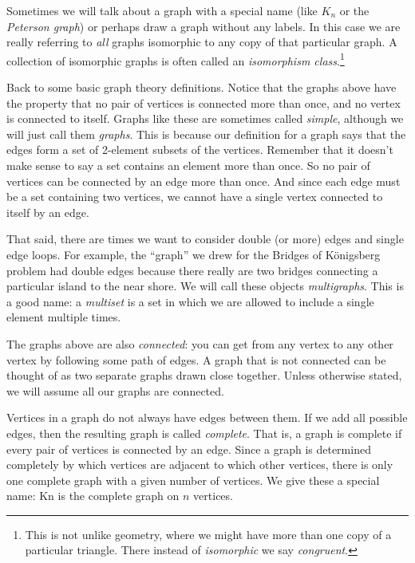\documentclass[12pt]{article}
\begin{document}
Sometimes we will talk about a graph with a special name (like $K_n$ or the \emph{Peterson graph}) or perhaps draw a graph without any labels.  In this case we are really referring to \emph{all} graphs isomorphic to any copy of that particular graph.  A collection of isomorphic graphs is often called an \emph{isomorphism class}.\footnote{This is not unlike geometry, where we might have more than one copy of a particular triangle.  There instead of \emph{isomorphic} we say \emph{congruent}.}

Back to some basic graph theory definitions.  Notice that the graphs above have the property that no pair of vertices is connected more than once, and no vertex is connected to itself.  Graphs like these are sometimes called {\em simple}, although we will just call them {\em graphs}.  This is because our definition for a graph says that the edges form a set of 2-element subsets of the vertices.  Remember that it doesn't make sense to say a set contains an element more than once.  So no pair of vertices can be connected by an edge more than once.  And since each edge must be a set containing two vertices, we cannot have a single vertex connected to itself by an edge.  

That said, there are times we want to consider double (or more) edges and single edge loops.  For example, the ``graph'' we drew for the Bridges of K\"onigsberg problem had double edges because there really are two bridges connecting a particular island to the near shore.  We will call these objects {\em multigraphs}.  This is a good name: a \emph{multiset} is a set in which we are allowed to include a single element multiple times.

The graphs above are also {\em connected}: you can get from any vertex to any other vertex by following some path of edges.  A graph that is not connected can be thought of as two separate graphs drawn close together.  Unless otherwise stated, we will assume all our graphs are connected.  

Vertices in a graph do not always have edges between them.  If we add all possible edges, then the resulting graph is called {\em complete}.  That is, a graph is complete if every pair of vertices is connected by an edge.  Since a graph is determined completely by which vertices are adjacent to which other vertices, there is only one complete graph with a given number of vertices.  We give these a special name: \gls{Kn} is the complete graph on $n$ vertices.
\end{document}
